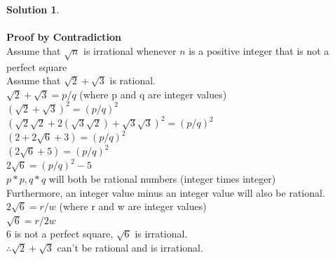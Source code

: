 \documentclass{article}
\theoremstyle{definition}
\newtheorem*{solution}{Solution}
\begin{document}
\begin{solution}\ \\ \ \\
\textbf{Proof by Contradiction}\ \\
Assume that $\sqrt{n}$ is irrational whenever $n$ is a positive integer that is not a perfect square\ \\
Assume that $\sqrt{2} + \sqrt{3}$ is rational.\ \\
$\sqrt{2} + \sqrt{3} = p/q$ (where p and q are integer values)\ \\
$(\sqrt{2} + \sqrt{3})^2 = (p/q)^2$\ \\
$(\sqrt{2}\sqrt{2} +2(\sqrt{3}\sqrt{2}) + \sqrt{3}\sqrt{3})^2 = (p/q)^2$\ \\
$(2 + 2\sqrt{6} + 3) =  (p/q)^2 $\ \\
$(2\sqrt{6} + 5) =  (p/q)^2 $\ \\
$2\sqrt{6} =  (p/q)^2-5$\ \\
$p*p, q*q$ will both be rational numbers (integer times integer)\ \\
Furthermore, an integer value minus an integer value will also be rational.\ \\
$2\sqrt{6} = r/w$ (where r and w are integer values)\ \\
$\sqrt{6} = r/2w$\ \\
$6$ is not a perfect square, $ \sqrt{6}$ is irrational.\ \\
$\therefore \sqrt{2} + \sqrt{3}$ can't be rational and is irrational.
\end{solution}
\end{document}
